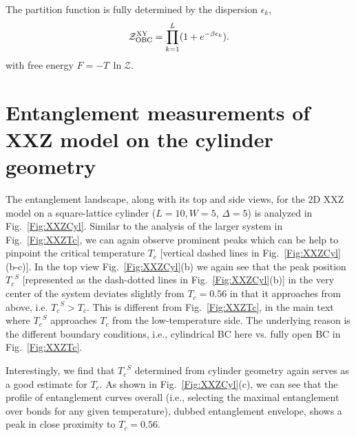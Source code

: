 \documentclass[aps,prx,twocolumn,showpacs,psfig,superscriptaddress,longbibliography]{revtex4-1}
\newcommand{\Fig}[1]{Fig.~\ref{#1}}
\def\Tc{\ensuremath{T_c}\xspace}
\def\TcS{\ensuremath{\Tc^{S}}\xspace}
\begin{document}
The partition function is fully determined by the dispersion
$\epsilon_k$, \begin{equation} \mathcal{Z}^{\rm{XY}}_{\rm{OBC}} =
\prod_{k=1}^L (1+e^{-\beta \epsilon_k}).  \end{equation} with free
energy $F=-T \, \ln{\mathcal{Z}}$.

\section{Entanglement measurements of XXZ model on the cylinder geometry}
\label{App:EntCyl}

The entanglement landscape, along with its top and side views, for
the 2D XXZ model on a square-lattice cylinder ($L=10, W=5$,
$\Delta=5$) is analyzed in \Fig{Fig:XXZCyl}.  Similar to the
analysis of the larger system in \Fig{Fig:XXZTc}, we can again
observe prominent peaks which can be help to pinpoint the critical
temperature $\Tc$ [vertical dashed lines in \Fig{Fig:XXZCyl}(b-c)].
%
In the top view \Fig{Fig:XXZCyl}(b) we again see that the peak
position $\Tc^S$  [represented as the dash-dotted lines in
\Fig{Fig:XXZCyl}(b)] in the very center of the system deviates
slightly from $\Tc=0.56$ in that it approaches from above, i.e.
$\Tc^S> \Tc$.  This is different from \Fig{Fig:XXZTc}, in the main
text where $\TcS$ approaches $\Tc$ from the low-temperature side.
 {The underlying reason is the different boundary conditions,} i.e., 
cylindrical BC here vs. fully open BC in \Fig{Fig:XXZTc}. 

Interestingly, we find that $\TcS$ determined from cylinder
geometry again serves as a good estimate for $\Tc$. As shown in
\Fig{Fig:XXZCyl}(c), we can see that the profile of entanglement
curves overall (i.e., selecting the maximal entanglement over bonds
for any given temperature), dubbed entanglement envelope, shows a
 peak in close proximity to  $\Tc=0.56$.


\end{document}

